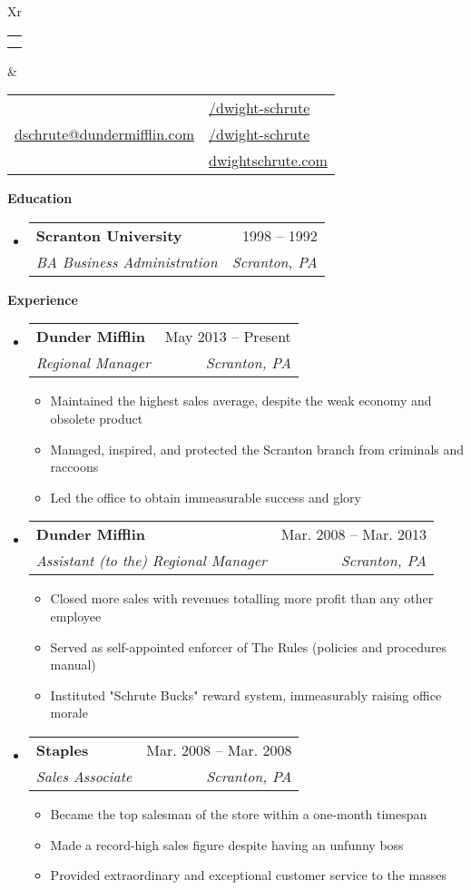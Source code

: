 \documentclass[letterpaper,12pt]{article}[leftmargin=*]
\makeatletter
\def \fullname {Dwight Schrute}
\def \subtitle {}
\def \linkedinicon {\faLinkedin}
\def \linkedinlink {https://linkedin.com/in/dwight-schrute/}
\def \linkedintext {/dwight-schrute}
\def \phoneicon {\faPhone}
\def \phonetext {+1-123-456-7890}
\def \emailicon {\faEnvelope}
\def \emaillink {mailto:dschrute@dundermifflin.com}
\def \emailtext {dschrute@dundermifflin.com}
\def \githubicon {\faGithub}
\def \githublink {https://github.com/dwight-schrute}
\def \githubtext {/dwight-schrute}
\def \websiteicon {\faGlobe}
\def \websitelink {https://google.com/}
\def \websitetext {dwightschrute.com}
\def \headertype {\doublecol} %
\def \entryspacing {-0pt}
\def \linkedin {\linkedinicon \hspace{3pt}\href{\linkedinlink}{\linkedintext}}
\def \phone {\phoneicon \hspace{3pt}{ \phonetext}}
\def \email {\emailicon \hspace{3pt}\href{\emaillink}{\emailtext}}
\def \github {\githubicon \hspace{3pt}\href{\githublink}{\githubtext}}
\def \website {\websiteicon \hspace{3pt}\href{\websitelink}{\websitetext}}
\renewcommand{\section}[2]{\vspace{5pt}
  \colorbox{secondary}{\color{white}\raggedbottom\normalsize\textbf{{#1}{\hspace{7pt}#2}}}
}
\newcommand{\resumeEntryStart}{\begin{itemize}[leftmargin=2.5mm]}
\newcommand{\resumeEntryEnd}{\end{itemize}\vspace{\entryspacing}}
\newcommand{\resumeItemListStart}{\begin{itemize}[leftmargin=4.5mm]}
\newcommand{\resumeItemListEnd}{\end{itemize}}
\newcommand{\resumeItem}[1]{
  \item\small{
    {#1 \vspace{-2pt}}
  }
}
\newcommand{\resumeEntryTSDL}[4]{
  \vspace{-1pt}\item[]
    \begin{tabularx}{0.97\textwidth}{X@{\hspace{60pt}}r}
      \textbf{\color{primary}#1} & {\firabook\color{accent}\small#2} \\
      \textit{\color{accent}\small#3} & \textit{\color{accent}\small#4} \\
    \end{tabularx}\vspace{-6pt}
}
\newcommand{\doublecol}[6]{
  \begin{tabularx}{\textwidth}{Xr}
    {
      \begin{tabular}[c]{l}
        \fontsize{35}{45}\selectfont{\color{primary}{{\textbf{\fullname}}}} \\
        {\textit{\subtitle}} %
      \end{tabular}
    } & {
      \begin{tabular}[c]{l@{\hspace{1.5em}}l}
        {\small#4} & {\small#1} \\
        {\small#5} & {\small#2} \\
        {\small#6} & {\small#3}
      \end{tabular}
    }
  \end{tabularx}
}
\newcommand{\singlecol}[6]{
  \begin{tabularx}{\textwidth}{Xr}
    {
      \begin{tabular}[b]{l}
        \fontsize{35}{45}\selectfont{\color{primary}{{\textbf{\fullname}}}} \\
        {\textit{\subtitle}} %
      \end{tabular}
    } & {
      \begin{tabular}[c]{l}
        {\small#1} \\
        {\small#2} \\
        {\small#3} \\
        {\small#4} \\
        {\small#5} \\
        {\small#6}
      \end{tabular}
    }
  \end{tabularx}
}
\makeatother
\begin{document}


\headertype{\linkedin}{\github}{\website}{\phone}{\email}{} %
\vspace{-10pt} %

\section{\faGraduationCap}{Education}

  \resumeEntryStart
    \resumeEntryTSDL
      {Scranton University}{1998 -- 1992}
      {BA Business Administration}{Scranton, PA}
  \resumeEntryEnd

\section{\faPieChart}{Experience}

  \resumeEntryStart
    \resumeEntryTSDL
      {Dunder Mifflin}{May 2013 -- Present}
      {Regional Manager}{Scranton, PA}
    \resumeItemListStart
      \resumeItem {Maintained the highest sales average, despite the weak economy and obsolete product}
      \resumeItem {Managed, inspired, and protected the Scranton branch from criminals and raccoons}
      \resumeItem {Led the office to obtain immeasurable success and glory}
    \resumeItemListEnd
  \resumeEntryEnd

  \resumeEntryStart
    \resumeEntryTSDL
      {Dunder Mifflin}{Mar. 2008 -- Mar. 2013}
      {Assistant (to the) Regional Manager}{Scranton, PA}
    \resumeItemListStart
      \resumeItem {Closed more sales with revenues totalling more profit than any other employee}
      \resumeItem {Served as self-appointed enforcer of The Rules (policies and procedures manual)}
      \resumeItem {Instituted "Schrute Bucks" reward system, immeasurably raising office morale}
    \resumeItemListEnd
  \resumeEntryEnd

  \resumeEntryStart
    \resumeEntryTSDL
      {Staples}{Mar. 2008 -- Mar. 2008}
      {Sales Associate}{Scranton, PA}
    \resumeItemListStart
        \resumeItem {Became the top salesman of the store within a one-month timespan}
        \resumeItem {Made a record-high sales figure despite having an unfunny boss}
        \resumeItem {Provided extraordinary and exceptional customer service to the masses}
    \resumeItemListEnd
  \resumeEntryEnd
\end{document}
